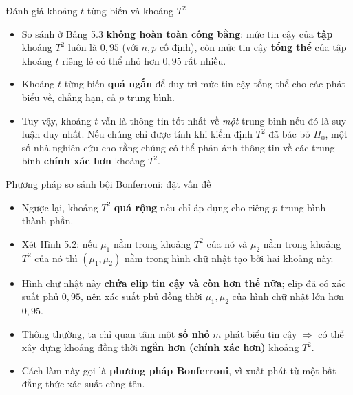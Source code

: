\begin{frame}{Đánh giá khoảng $t$ từng biến và khoảng $T^2$}
\begin{itemize}
  \item So sánh ở Bảng 5.3 \textbf{không hoàn toàn công bằng}: mức tin cậy của
        \textbf{tập} khoảng $T^2$ luôn là $0{,}95$ (với $n,p$ cố định), còn mức
        tin cậy \textbf{tổng thể} của tập khoảng $t$ riêng lẻ có thể nhỏ hơn
        $0{,}95$ rất nhiều.
  \item Khoảng $t$ từng biến \textbf{quá ngắn} để duy trì mức tin cậy tổng thể
        cho các phát biểu về, chẳng hạn, cả $p$ trung bình.
  \item Tuy vậy, khoảng $t$ vẫn là thông tin tốt nhất về \emph{một} trung bình
        nếu đó là suy luận duy nhất. Nếu chúng chỉ được tính khi kiểm định $T^2$
        đã bác bỏ $H_0$, một số nhà nghiên cứu cho rằng chúng có thể phản ánh
        thông tin về các trung bình \textbf{chính xác hơn} khoảng $T^2$.
\end{itemize}
\end{frame}


\begin{frame}{Phương pháp so sánh bội Bonferroni: đặt vấn đề}
  \begin{itemize}
    \item Ngược lại, khoảng $T^2$ \textbf{quá rộng} nếu chỉ áp dụng cho riêng $p$ trung bình thành phần.
    \item Xét Hình 5.2: nếu $\mu_1$ nằm trong khoảng $T^2$ của nó và $\mu_2$ nằm trong khoảng $T^2$ của nó thì $(\mu_1,\mu_2)$ nằm trong hình chữ nhật tạo bởi hai khoảng này.
    \item Hình chữ nhật này \textbf{chứa elip tin cậy và còn hơn thế nữa}; elip đã có xác suất phủ $0{,}95$, nên xác suất phủ đồng thời $\mu_1,\mu_2$ của hình chữ nhật lớn hơn $0{,}95$.
    \item Thông thường, ta chỉ quan tâm một \textbf{số nhỏ} $m$ phát biểu tin cậy $\Rightarrow$ có thể xây dựng khoảng đồng thời \textbf{ngắn hơn (chính xác hơn)} khoảng $T^2$.
    \item Cách làm này gọi là \textbf{phương pháp Bonferroni}, vì xuất phát từ một bất đẳng thức xác suất cùng tên.
  \end{itemize}
\end{frame}
 
